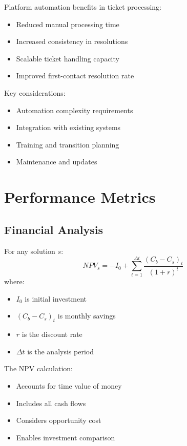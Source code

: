 \documentclass[12pt,a4paper]{article}
\newenvironment{definition}[1]
{\begin{mdframed}[style=definitionstyle,frametitle={Definition: #1}]}
{\end{mdframed}}
\newenvironment{explanation}
{\begin{mdframed}[style=explanationstyle,frametitle={Explanation}]}
{\end{mdframed}}
\newenvironment{observation}
{\begin{mdframed}[style=observationstyle,frametitle={Observation}]}
{\end{mdframed}}
\begin{document}
\begin{observation}
Platform automation benefits in ticket processing:
\begin{itemize}
    \item Reduced manual processing time
    \item Increased consistency in resolutions
    \item Scalable ticket handling capacity
    \item Improved first-contact resolution rate
\end{itemize}

Key considerations:
\begin{itemize}
    \item Automation complexity requirements
    \item Integration with existing systems
    \item Training and transition planning
    \item Maintenance and updates
\end{itemize}
\end{observation}

\section{Performance Metrics}
\subsection{Financial Analysis}
\begin{definition}{NPV Calculation}
For any solution $s$:
\begin{equation}
    NPV_s = -I_0 + \sum_{t=1}^{\Delta t} \frac{(C_b - C_s)_t}{(1 + r)^t}
\end{equation}
where:
\begin{itemize}
    \item $I_0$ is initial investment
    \item $(C_b - C_s)_t$ is monthly savings
    \item $r$ is the discount rate
    \item $\Delta t$ is the analysis period
\end{itemize}
\end{definition}

\begin{explanation}
The NPV calculation:
\begin{itemize}
    \item Accounts for time value of money
    \item Includes all cash flows
    \item Considers opportunity cost
    \item Enables investment comparison
\end{itemize}
\end{explanation}
\end{document}
